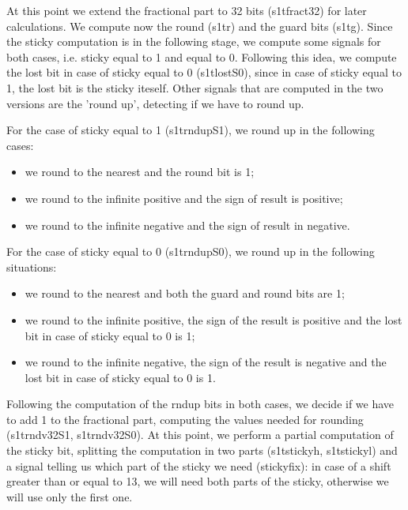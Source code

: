 At this point we extend the fractional part to 32 bits (s1t\textunderscore fract32) for later calculations. We compute now the round (s1t\textunderscore r) and the guard bits (s1t\textunderscore g). Since the sticky computation is in the following stage, we compute some signals for both cases, i.e. sticky equal to 1 and equal to 0. Following this idea, we compute the lost bit in case of sticky equal to 0 (s1t\textunderscore lostS0), since in case of sticky equal to 1, the lost bit is the sticky iteself. Other signals that are computed in the two versions are the 'round up', detecting if we have to round up.

For the case of sticky equal to 1 (s1t\textunderscore rnd\textunderscore upS1), we round up in the following cases:
\begin{itemize}
\item we round to the nearest and the round bit is 1;
\item we round to the infinite positive and the sign of result is positive;
\item we round to the infinite negative and the sign of result in negative.
\end{itemize}

For the case of sticky equal to 0 (s1t\textunderscore rnd\textunderscore upS0), we round up in the following situations:
\begin{itemize}
\item we round to the nearest and both the guard and round bits are 1;
\item we round to the infinite positive, the sign of the result is positive and the lost bit in case of sticky equal to 0 is 1;
\item we round to the infinite negative, the sign of the result is negative and the lost bit in case of sticky equal to 0 is 1.
\end{itemize}

Following the computation of the rnd\textunderscore up bits in both cases, we decide if we have to add 1 to the fractional part, computing the values needed for rounding (s1t\textunderscore rnd\textunderscore v32S1, s1t\textunderscore rnd\textunderscore v32S0).
At this point, we perform a partial computation of the sticky bit, splitting the computation in two parts (s1t\textunderscore stickyh, s1t\textunderscore stickyl) and a signal telling us which part of the sticky we need (stickyfix): in case of a shift greater than or equal to 13, we will need both parts of the sticky, otherwise we will use only the first one.

